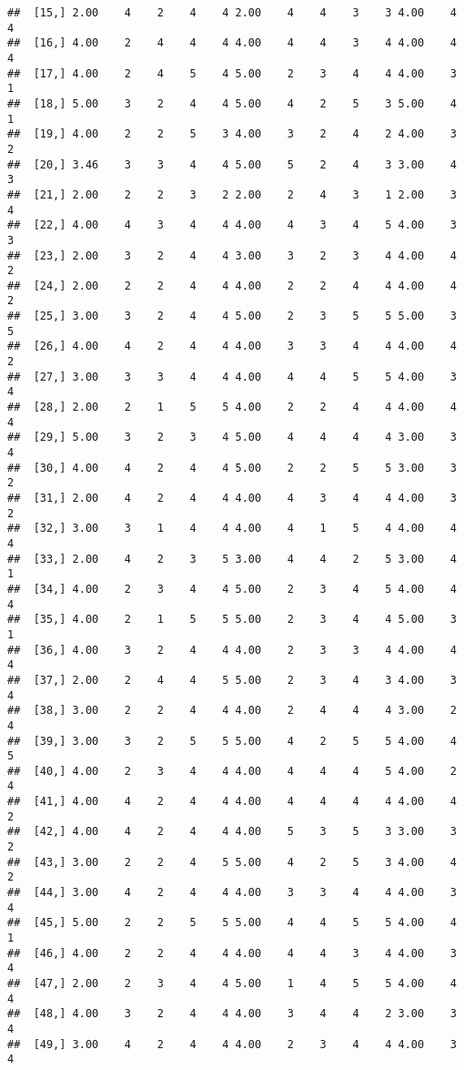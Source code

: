 \documentclass[]{article}
\begin{document}
\begin{verbatim}
##  [15,] 2.00    4    2    4    4 2.00    4    4    3    3 4.00    4    4
##  [16,] 4.00    2    4    4    4 4.00    4    4    3    4 4.00    4    4
##  [17,] 4.00    2    4    5    4 5.00    2    3    4    4 4.00    3    1
##  [18,] 5.00    3    2    4    4 5.00    4    2    5    3 5.00    4    1
##  [19,] 4.00    2    2    5    3 4.00    3    2    4    2 4.00    3    2
##  [20,] 3.46    3    3    4    4 5.00    5    2    4    3 3.00    4    3
##  [21,] 2.00    2    2    3    2 2.00    2    4    3    1 2.00    3    4
##  [22,] 4.00    4    3    4    4 4.00    4    3    4    5 4.00    3    3
##  [23,] 2.00    3    2    4    4 3.00    3    2    3    4 4.00    4    2
##  [24,] 2.00    2    2    4    4 4.00    2    2    4    4 4.00    4    2
##  [25,] 3.00    3    2    4    4 5.00    2    3    5    5 5.00    3    5
##  [26,] 4.00    4    2    4    4 4.00    3    3    4    4 4.00    4    2
##  [27,] 3.00    3    3    4    4 4.00    4    4    5    5 4.00    3    4
##  [28,] 2.00    2    1    5    5 4.00    2    2    4    4 4.00    4    4
##  [29,] 5.00    3    2    3    4 5.00    4    4    4    4 3.00    3    4
##  [30,] 4.00    4    2    4    4 5.00    2    2    5    5 3.00    3    2
##  [31,] 2.00    4    2    4    4 4.00    4    3    4    4 4.00    3    2
##  [32,] 3.00    3    1    4    4 4.00    4    1    5    4 4.00    4    4
##  [33,] 2.00    4    2    3    5 3.00    4    4    2    5 3.00    4    1
##  [34,] 4.00    2    3    4    4 5.00    2    3    4    5 4.00    4    4
##  [35,] 4.00    2    1    5    5 5.00    2    3    4    4 5.00    3    1
##  [36,] 4.00    3    2    4    4 4.00    2    3    3    4 4.00    4    4
##  [37,] 2.00    2    4    4    5 5.00    2    3    4    3 4.00    3    4
##  [38,] 3.00    2    2    4    4 4.00    2    4    4    4 3.00    2    4
##  [39,] 3.00    3    2    5    5 5.00    4    2    5    5 4.00    4    5
##  [40,] 4.00    2    3    4    4 4.00    4    4    4    5 4.00    2    4
##  [41,] 4.00    4    2    4    4 4.00    4    4    4    4 4.00    4    2
##  [42,] 4.00    4    2    4    4 4.00    5    3    5    3 3.00    3    2
##  [43,] 3.00    2    2    4    5 5.00    4    2    5    3 4.00    4    2
##  [44,] 3.00    4    2    4    4 4.00    3    3    4    4 4.00    3    4
##  [45,] 5.00    2    2    5    5 5.00    4    4    5    5 4.00    4    1
##  [46,] 4.00    2    2    4    4 4.00    4    4    3    4 4.00    3    4
##  [47,] 2.00    2    3    4    4 5.00    1    4    5    5 4.00    4    4
##  [48,] 4.00    3    2    4    4 4.00    3    4    4    2 3.00    3    4
##  [49,] 3.00    4    2    4    4 4.00    2    3    4    4 4.00    3    4

\end{verbatim}
\end{document}
